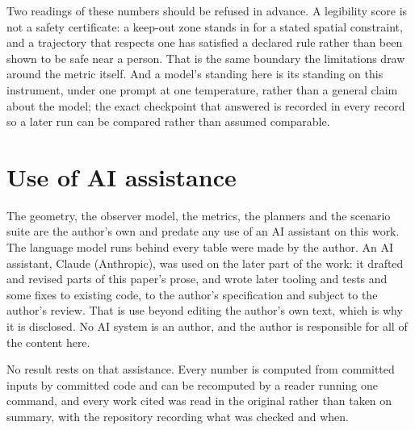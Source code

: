 \documentclass[sigconf,nonacm]{acmart}
\begin{document}
Two readings of these numbers should be refused in advance. A legibility
score is not a safety certificate: a keep-out zone stands in for a stated
spatial constraint, and a trajectory that respects one has satisfied a
declared rule rather than been shown to be safe near a person. That is
the same boundary the limitations draw around the metric itself. And a
model's standing here is its standing on this instrument, under one
prompt at one temperature, rather than a general claim about the model;
the exact checkpoint that answered is recorded in every record so a later
run can be compared rather than assumed comparable.

\section{Use of AI assistance}

The geometry, the observer model, the metrics, the planners and the
scenario suite are the author's own and predate any use of an AI
assistant on this work. The language model runs behind every table were
made by the author. An AI assistant, Claude (Anthropic), was used on the
later part of the work: it drafted and revised parts of this paper's
prose, and wrote later tooling and tests and some fixes to existing
code, to the author's specification and subject to the author's review.
That is use beyond editing the author's own text, which is why it is
disclosed. No AI system is an author, and the author is responsible for
all of the content here.

No result rests on that assistance. Every number is computed from
committed inputs by committed code and can be recomputed by a reader
running one command, and every work cited was read in the original
rather than taken on summary, with the repository recording what was
checked and when.



\end{document}
